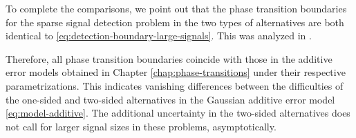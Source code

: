 To complete the comparisons, we point out that the phase transition boundaries for the sparse signal {detection} problem in the two types of alternatives are both identical to \eqref{eq:detection-boundary-large-signals}. This was analyzed in \cite{donoho2004higher}.

Therefore, all phase transition boundaries coincide with those in the additive error models obtained in Chapter \ref{chap:phase-transitions} under their respective parametrizations.
This indicates vanishing differences between the difficulties of the one-sided and two-sided alternatives in the Gaussian additive error model 
\eqref{eq:model-additive}. The additional uncertainty in the two-sided alternatives does not call for larger signal sizes in these problems, asymptotically.


